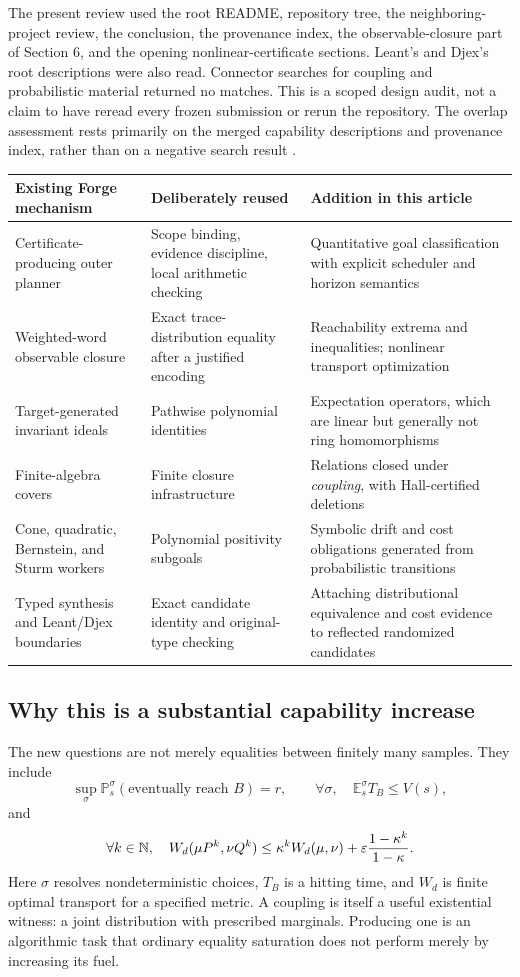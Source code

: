 \documentclass[11pt,letterpaper]{article}
\theoremstyle{definition}\newtheorem{definition}[theorem]{Definition}
\theoremstyle{remark}\newtheorem{remark}[theorem]{Remark}
\newcommand{\E}{\mathbb E}\newcommand{\Prob}{\mathbb P}
\begin{document}
The present review used the root README, repository tree, the neighboring-project review, the conclusion, the provenance index, the observable-closure part of Section 6, and the opening nonlinear-certificate sections. Leant's and Djex's root descriptions were also read. Connector searches for coupling and probabilistic material returned no matches. This is a scoped design audit, not a claim to have reread every frozen submission or rerun the repository. The overlap assessment rests primarily on the merged capability descriptions and provenance index, rather than on a negative search result \cite{forge-provenance,forge-neighbors}.

\begin{longtable}{@{}L{0.29\textwidth}L{0.31\textwidth}L{0.34\textwidth}@{}}
\toprule
Existing Forge mechanism & Deliberately reused & Addition in this article\\\midrule\endhead
Certificate-producing outer planner & Scope binding, evidence discipline, local arithmetic checking & Quantitative goal classification with explicit scheduler and horizon semantics\\
Weighted-word observable closure & Exact trace-distribution equality after a justified encoding & Reachability extrema and inequalities; nonlinear transport optimization\\
Target-generated invariant ideals & Pathwise polynomial identities & Expectation operators, which are linear but generally not ring homomorphisms\\
Finite-algebra covers & Finite closure infrastructure & Relations closed under \emph{coupling}, with Hall-certified deletions\\
Cone, quadratic, Bernstein, and Sturm workers & Polynomial positivity subgoals & Symbolic drift and cost obligations generated from probabilistic transitions\\
Typed synthesis and Leant/Djex boundaries & Exact candidate identity and original-type checking & Attaching distributional equivalence and cost evidence to reflected randomized candidates\\\bottomrule
\end{longtable}

\subsection{Why this is a substantial capability increase}
The new questions are not merely equalities between finitely many samples. They include
\[
 \sup_\sigma\Prob_s^\sigma(\text{eventually reach }B)=r,
 \qquad \forall\sigma,\quad \E_s^\sigma T_B\le V(s),
\]
and
\[
 \forall k\in\mathbb N,\quad
 W_d(\mu P^k,\nu Q^k)
 \le \kappa^k W_d(\mu,\nu)
       +\varepsilon\frac{1-\kappa^k}{1-\kappa}.
\]
Here $\sigma$ resolves nondeterministic choices, $T_B$ is a hitting time, and $W_d$ is finite optimal transport for a specified metric. A coupling is itself a useful existential witness: a joint distribution with prescribed marginals. Producing one is an algorithmic task that ordinary equality saturation does not perform merely by increasing its fuel.
\end{document}
